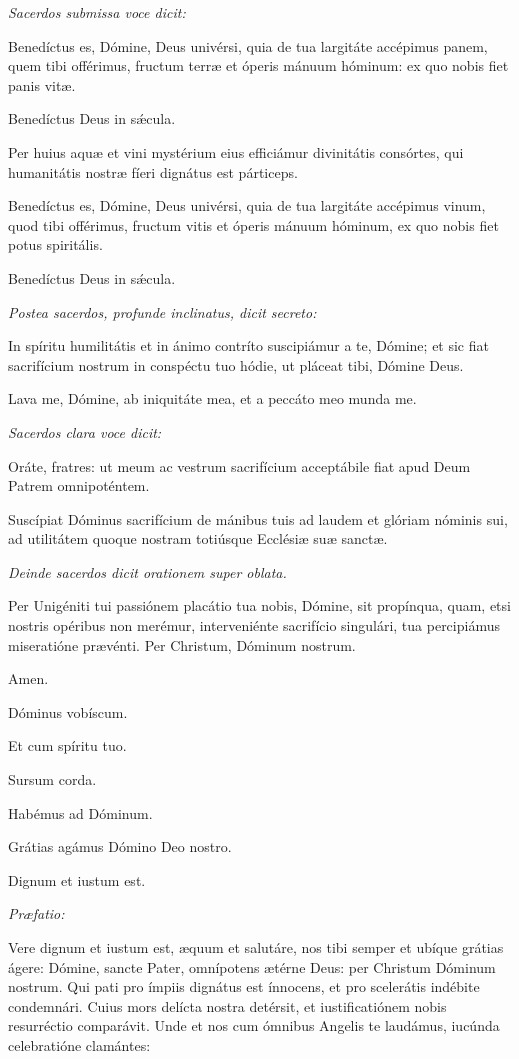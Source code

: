 \textit{Sacerdos submissa voce dicit:}

Benedíctus es, Dómine, Deus univérsi, quia de tua largitáte accépimus panem, quem tibi offérimus, fructum terræ et óperis mánuum hóminum: ex quo nobis fiet panis vitæ.

\Rbardot{} Benedíctus Deus in sǽcula.

Per huius aquæ et vini mystérium eius efficiámur divinitátis consórtes, qui humanitátis nostræ fíeri dignátus est párticeps.

Benedíctus es, Dómine, Deus univérsi, quia de tua largitáte accépimus vinum, quod tibi offérimus, fructum vitis et óperis mánuum hóminum, ex quo nobis fiet potus spiritális.

\Rbardot{} Benedíctus Deus in sǽcula.

\textit{Postea sacerdos, profunde inclinatus, dicit secreto:}

In spíritu humilitátis et in ánimo contríto suscipiámur a te, Dómine; et sic fiat sacrifícium nostrum in conspéctu tuo hódie, ut pláceat tibi, Dómine Deus.

Lava me, Dómine, ab iniquitáte mea, et a peccáto meo munda me.

\textit{Sacerdos clara voce dicit:}

Oráte, fratres: ut meum ac vestrum sacrifícium acceptábile fiat apud Deum Patrem omnipoténtem.

\Rbardot{} Suscípiat Dóminus sacrifícium de mánibus tuis ad laudem et glóriam nóminis sui, ad utilitátem quoque nostram totiúsque Ecclésiæ suæ sanctæ.

\textit{Deinde sacerdos dicit orationem super oblata.}

Per Unigéniti tui passiónem placátio tua nobis, Dómine, sit propínqua, quam, etsi nostris opéribus non merémur, interveniénte sacrifício singulári, tua percipiámus miseratióne prævénti. Per Christum, Dóminum nostrum.

\Rbardot{} Amen.

\Vbardot{} Dóminus vobíscum.

\Rbardot{} Et cum spíritu tuo.

\Vbardot{} Sursum corda.

\Rbardot{} Habémus ad Dóminum.

\Vbardot{} Grátias agámus Dómino Deo nostro.

\Rbardot{} Dignum et iustum est.

\textit{Præfatio:}

Vere dignum et iustum est, æquum et salutáre, nos tibi semper et ubíque grátias ágere: Dómine, sancte Pater, omnípotens ætérne Deus: per Christum Dóminum nostrum. Qui pati pro ímpiis dignátus est ínnocens, et pro scelerátis indébite condemnári. Cuius mors delícta nostra detérsit, et iustificatiónem nobis resurréctio comparávit. Unde et nos cum ómnibus Angelis te laudámus, iucúnda celebratióne clamántes:
